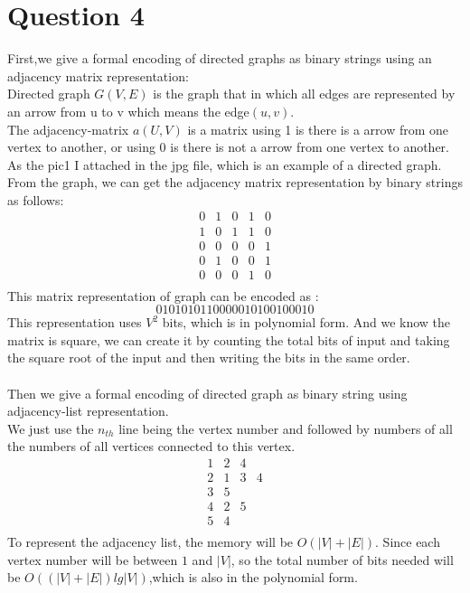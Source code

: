 \documentclass[paper=a4, fontsize=11pt]{scrartcl} %
\numberwithin{equation}{section} %
\numberwithin{figure}{section} %
\numberwithin{table}{section} %
\begin{document}
\section{\textbf{Question 4}}
First,we give a formal encoding of directed graphs as binary strings using an adjacency matrix representation:\\
Directed graph $G(V,E)$ is the graph that in which all edges are represented by an arrow from u to v which means the edge$(u,v)$.\\
The adjacency-matrix $a(U,V)$ is a matrix using 1 is there is a arrow from one vertex to another, or using 0 is there is not a arrow from one vertex to another.\\
As the pic1 I attached in the jpg file, which is an example of a directed graph. From the graph, we can get the adjacency matrix representation by binary strings as follows:\\
$$
\begin{matrix}
     0 & 1 & 0 & 1 & 0 \\
     1 & 0 & 1 & 1 & 0 \\
     0 & 0 & 0 & 0 & 1 \\
     0 & 1 & 0 & 0 & 1 \\
     0 & 0 & 0 & 1 & 0 \\
\end{matrix}
$$
This matrix representation of graph can be encoded as :\\
$$ 01010 10110 00001 01001 00010$$
This representation uses $V^2$ bits, which is in polynomial form. And we know the matrix is square, we can create it by counting the total bits of input and taking the square root of the input and then writing the bits in the same order.\\ \\
Then we give a formal encoding of directed graph as binary string using adjacency-list representation.\\
We just use the $n_{th}$ line being the vertex number and followed by numbers of all the numbers of all vertices connected to this vertex.\\
$$
\begin{matrix}
     1 & 2 & 4 \\
     2 & 1 & 3 & 4 \\
     3 & 5\\
     4 & 2 & 5 \\
     5 & 4 \\
\end{matrix}
$$
To represent the adjacency list, the memory will be $O(|V|+|E|)$. Since each vertex number will be between $1$ and $|V|$, so the total number of bits needed will be $O((|V|+|E|)lg|V|)$,which is also in the polynomial form.\\
\end{document}
